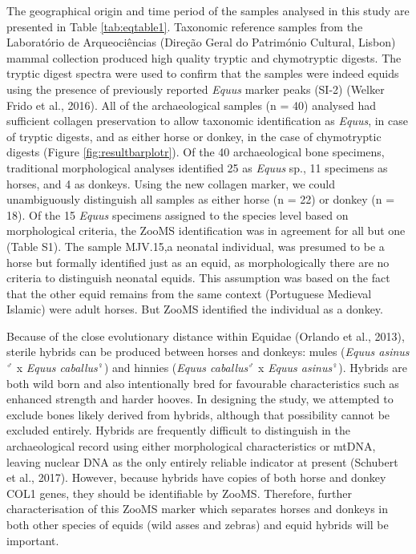 \documentclass[preprint, 3p, authoryear]{elsarticle} %
\begin{document}
The geographical origin and time period of the samples analysed in this study are presented in Table \ref{tab:eqtable1}.
Taxonomic reference samples from the Laboratório de Arqueociências (Direção Geral do Património Cultural, Lisbon) mammal collection produced high quality tryptic and chymotryptic digests. The tryptic digest spectra were used to confirm that the samples were indeed equids using the presence of previously reported \emph{Equus} marker peaks (SI-2) (Welker Frido et al., 2016). All of the archaeological samples (n = 40) analysed had sufficient collagen preservation to allow taxonomic identification as \emph{Equus}, in case of tryptic digests, and as either horse or donkey, in the case of chymotryptic digests (Figure \ref{fig:resultbarplotr}). Of the 40 archaeological bone specimens, traditional morphological analyses identified 25 as \emph{Equus} sp., 11 specimens as horses, and 4 as donkeys. Using the new collagen marker, we could unambiguously distinguish all samples as either horse (n = 22) or donkey (n = 18). Of the 15 \emph{Equus} specimens assigned to the species level based on morphological criteria, the ZooMS identification was in agreement for all but one (Table S1). The sample MJV.15,a neonatal individual, was presumed to be a horse but formally identified just as an equid, as morphologically there are no criteria to distinguish neonatal equids. This assumption was based on the fact that the other equid remains from the same context (Portuguese Medieval Islamic) were adult horses. But ZooMS identified the individual as a donkey.

Because of the close evolutionary distance within Equidae (Orlando et al., 2013), sterile hybrids can be produced between horses and donkeys: mules (\emph{Equus asinus}\(^{\male}\) x \emph{Equus caballus}\(^{\female}\)) and hinnies (\emph{Equus caballus}\(^{\male}\) x \emph{Equus asinus}\(^{\female}\)). Hybrids are both wild born and also intentionally bred for favourable characteristics such as enhanced strength and harder hooves. In designing the study, we attempted to exclude bones likely derived from hybrids, although that possibility cannot be excluded entirely. Hybrids are frequently difficult to distinguish in the archaeological record using either morphological characteristics or mtDNA, leaving nuclear DNA as the only entirely reliable indicator at present (Schubert et al., 2017). However, because hybrids have copies of both horse and donkey COL1 genes, they should be identifiable by ZooMS. Therefore, further characterisation of this ZooMS marker which separates horses and donkeys in both other species of equids (wild asses and zebras) and equid hybrids will be important.
\end{document}
